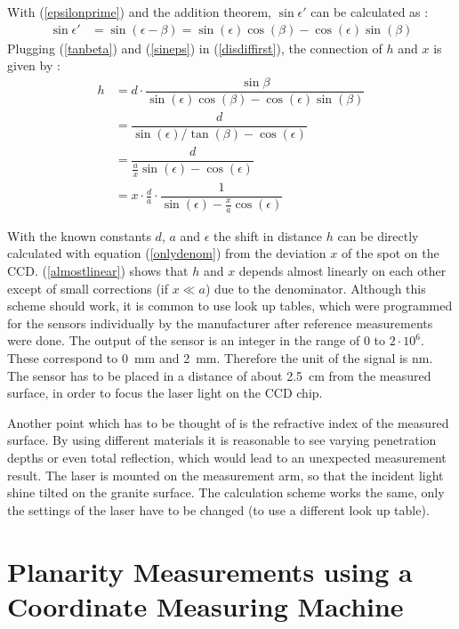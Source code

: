 \documentclass[
a4paper,                                %
twoside,                                %
BCOR1.4cm,                      %
10pt,                           %
headings=normal,                %
headsepline,                    %
clearplainpage, %
final,                                  %
div=14,
parskip=full,
openright,
bibliography=toc
]{scrreprt}
\begin{document}
With (\ref{epsilonprime}) and the addition theorem, $\sin \epsilon'$ can be calculated as :
\begin{align}
	\sin \epsilon' &= \sin\left( \epsilon - \beta \right) = \sin(\epsilon) \cos(\beta) - \cos(\epsilon) \sin(\beta)
	\label{sineps}
\end{align}
Plugging (\ref{tanbeta}) and (\ref{sineps}) in (\ref{disdiffirst}), the connection of $h$ and $x$ is given by : 
\begin{align}
	h &= d \cdot \dfrac{\sin \beta}{\sin(\epsilon) \cos(\beta) - \cos(\epsilon) \sin(\beta)}
	\nonumber
	\\
	 &= \dfrac{d}{\sin(\epsilon) / \tan(\beta) - \cos(\epsilon)}
	\nonumber
	\\
	 &= \dfrac{d}{\frac{a}{x} \sin(\epsilon) - \cos(\epsilon)}
	\label{onlydenom}
 	\\
	 &= x \cdot \frac{d}{a} \cdot \dfrac{1}{\sin(\epsilon) - \frac{x}{a} \cos(\epsilon)}
	\label{almostlinear}
\end{align}

With the known constants $d$, $a$ and $\epsilon$ the shift in distance $h$ can be directly calculated with equation (\ref{onlydenom}) from the deviation $x$ of the spot on the CCD.
(\ref{almostlinear}) shows that $h$ and $x$ depends almost linearly on each other except of small corrections (if $x \ll a$) due to the denominator. Although this scheme should work, it is common to use look up tables, which were programmed for the sensors individually by the manufacturer after reference measurements were done. The output of the sensor is an integer in the range of 0 to $2 \cdot\!10^{6}$. These correspond to \SI{0}{\mm} and \SI{2}{\mm}. Therefore the unit of the signal is nm. The sensor has to be placed in a distance of about \SI{2.5}{\cm} from the measured surface, in order to focus the laser light on the CCD chip. 

Another point which has to be thought of is the refractive index of the measured surface. By using different materials it is reasonable to see varying penetration depths or even total reflection, which would lead to an unexpected measurement result. The laser is mounted on the measurement arm, so that the incident light shine tilted on the granite surface. The calculation scheme works the same, only the settings of the laser have to be changed (to use a different look up table).

\section{Planarity Measurements using a Coordinate Measuring Machine}\label{planmeasCMM}
\end{document}
